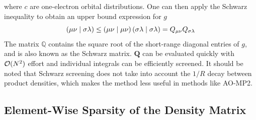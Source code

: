 \noindent where $c$ are one-electron orbital distributions. One can then apply the Schwarz inequality \cite{Hf1989} to obtain an upper bound expression for $g$
\begin{equation}
\left( \mu\nu \mid \sigma\lambda \right) \leq \left( \mu\nu \mid \mu\nu \right) \left( \sigma\lambda \mid \sigma\lambda \right) = Q_{\mu\nu} Q_{\sigma\lambda}
\end{equation}
\noindent The matrix $\mathbb{Q}$ contains the square root of the short-range diagonal entries of $g$, and is also known as the Schwarz matrix. $\mathbf{Q}$ can be evaluated quickly with $\mathcal{O}(N^{2})$ effort and individual integrals can be efficiently screened. It should be noted that Schwarz screening does not take into account the $1/R$ decay between product densities, which makes the method less useful in methods like AO-MP2.

\subsection{Element-Wise Sparsity of the Density Matrix}

